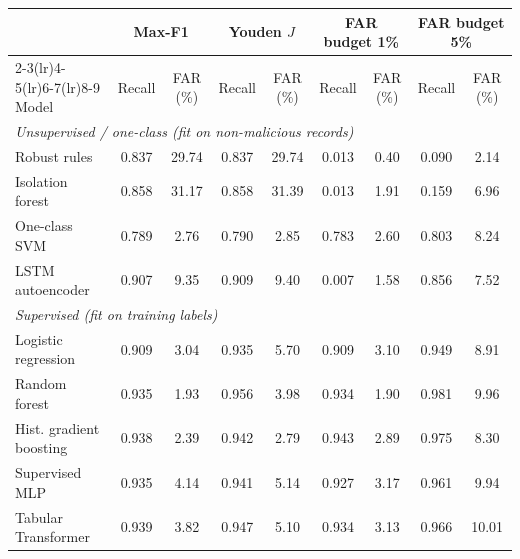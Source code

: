 \begin{tabular}{lcccccccc}
\toprule
& \multicolumn{2}{c}{Max-F1} & \multicolumn{2}{c}{Youden $J$} & \multicolumn{2}{c}{FAR budget 1\%} & \multicolumn{2}{c}{FAR budget 5\%} \\
\cmidrule(lr){2-3}\cmidrule(lr){4-5}\cmidrule(lr){6-7}\cmidrule(lr){8-9}
Model & Recall & FAR (\%) & Recall & FAR (\%) & Recall & FAR (\%) & Recall & FAR (\%) \\
\midrule
\multicolumn{9}{l}{\textit{Unsupervised / one-class (fit on non-malicious records)}} \\
Robust rules & 0.837 & 29.74 & 0.837 & 29.74 & 0.013 & 0.40 & 0.090 & 2.14 \\
Isolation forest & 0.858 & 31.17 & 0.858 & 31.39 & 0.013 & 1.91 & 0.159 & 6.96 \\
One-class SVM & 0.789 & 2.76 & 0.790 & 2.85 & 0.783 & 2.60 & 0.803 & 8.24 \\
LSTM autoencoder & 0.907 & 9.35 & 0.909 & 9.40 & 0.007 & 1.58 & 0.856 & 7.52 \\
\midrule
\multicolumn{9}{l}{\textit{Supervised (fit on training labels)}} \\
Logistic regression & 0.909 & 3.04 & 0.935 & 5.70 & 0.909 & 3.10 & 0.949 & 8.91 \\
Random forest & 0.935 & 1.93 & 0.956 & 3.98 & 0.934 & 1.90 & 0.981 & 9.96 \\
Hist. gradient boosting & 0.938 & 2.39 & 0.942 & 2.79 & 0.943 & 2.89 & 0.975 & 8.30 \\
Supervised MLP & 0.935 & 4.14 & 0.941 & 5.14 & 0.927 & 3.17 & 0.961 & 9.94 \\
Tabular Transformer & 0.939 & 3.82 & 0.947 & 5.10 & 0.934 & 3.13 & 0.966 & 10.01 \\
\bottomrule
\end{tabular}
